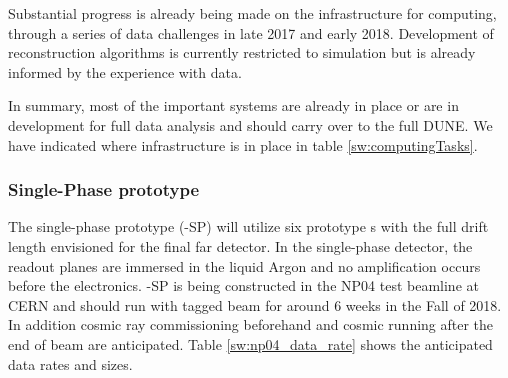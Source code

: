 Substantial progress is already being made on the infrastructure for computing, through a series of data challenges in late 2017 and early 2018. Development of reconstruction algorithms is currently restricted to simulation but is already informed by the experience with   data.


In summary, most of the important systems are already in place or are in development for full  data analysis and should carry over to the full DUNE.
We have indicated where infrastructure is in place in  table  \ref{sw:computingTasks}.




\subsubsection{Single-Phase prototype}

The single-phase prototype (-SP) will utilize six prototype s with the full drift length envisioned for the final far detector. In the single-phase detector, the readout planes are immersed in the liquid Argon and no amplification occurs before the electronics.    -SP is being constructed in the NP04 test beamline at CERN and should run with tagged  beam for around 6 weeks in the Fall of 2018.  In addition cosmic ray commissioning beforehand and cosmic running after the end of beam are anticipated.  Table \ref{sw:np04_data_rate}
shows the anticipated data rates and sizes. 


